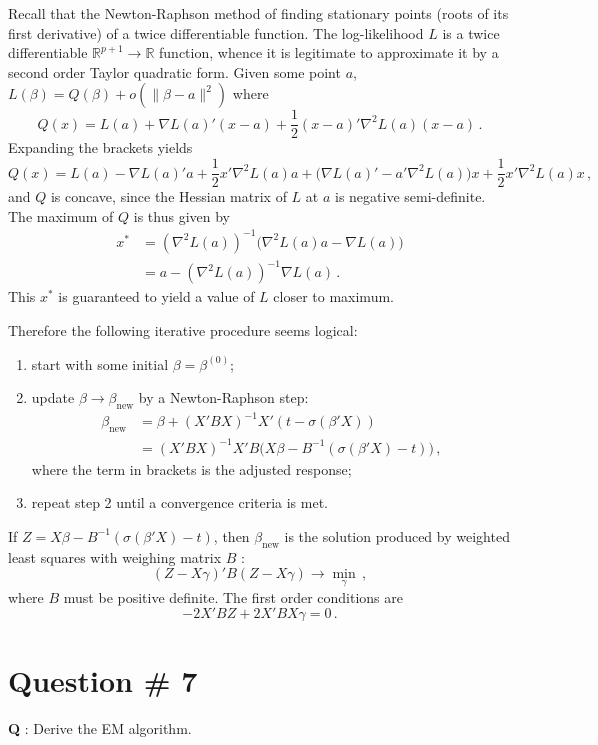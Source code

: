 \documentclass[a4paper]{article}
\newcommand{\Real}{\mathbb{R}}
\begin{document}
Recall that the Newton-Raphson method of finding stationary points (roots of its
first derivative) of a twice differentiable function. The log-likelihood $L$ is
a twice differentiable $\Real^{p+1}\to\Real$ function, whence it is legitimate
to approximate it by a second order Taylor quadratic form. Given some point $a$,
$L(\beta) = Q(\beta) + o(\|\beta-a\|^2)$ where
\[ Q(x) = L(a) + \nabla L(a)'(x-a) + \frac{1}{2}(x-a)'\nabla^2 L(a) (x-a)\,. \]
Expanding the brackets yields
\[
Q(x) = L(a) - \nabla L(a)'a + \frac{1}{2}x'\nabla^2 L(a) a
+ \bigl( \nabla L(a)' - a'\nabla^2 L(a) \bigr)x + \frac{1}{2}x'\nabla^2 L(a) x\,,
\]
and $Q$ is concave, since the Hessian matrix of $L$ at $a$ is negative semi-definite.
The maximum of $Q$ is thus given by
\begin{align*}
	x^*
	&= (\nabla^2 L(a))^{-1} \bigl( \nabla^2 L(a) a - \nabla L(a)\bigl) \\
	&= a - (\nabla^2 L(a))^{-1}\nabla L(a) \,.
\end{align*}
This $x^*$ is guaranteed to yield a value of $L$ closer to maximum.

Therefore the following iterative procedure seems logical: \begin{enumerate}
	\item start with some initial $\beta = \beta^{(0)}$;
	\item update $\beta \to \beta_{\text{new}}$ by a Newton-Raphson step:
	\begin{align*}
		\beta_{\text{new}}
		&= \beta + (X'BX)^{-1} X'( t - \sigma(\beta'X) ) \\
		&= (X'BX)^{-1} X'B \bigl( X \beta - B^{-1}( \sigma(\beta'X) - t ) \bigr) \,,
	\end{align*}
	where the term in brackets is the adjusted response;
	\item repeat step 2 until a convergence criteria is met.
\end{enumerate}
If $Z = X \beta - B^{-1}( \sigma(\beta'X) - t )$, then $\beta_{\text{new}}$ is the
solution produced by weighted least squares with weighing matrix $B$ :
\[ ( Z - X\gamma )'B (Z - X\gamma ) \to \min_\gamma \,, \]
where $B$ must be positive definite. The first order conditions are
\[ - 2 X'BZ + 2 X'BX \gamma = 0 \,. \]

\clearpage

\section[EM]{Question \# 7} %
\label{sec:question_7}
\textbf{\large \textbf{Q}} : Derive the EM algorithm.
\end{document}
